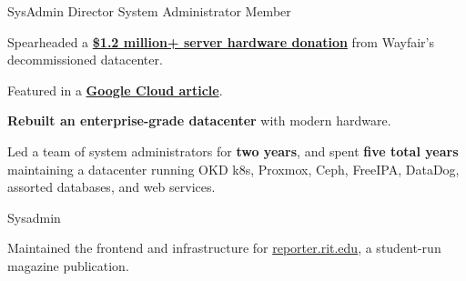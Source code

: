 \vspace{1.5pt} %


\cvtag{\LaTeX}

\smallskip


{
	{SysAdmin Director}    \hfill{}\newline
	{System Administrator} \hfill{}\newline
	{Member}               \hfill{}\newline
}
{
	\item{Spearheaded a \href{https://www.rit.edu/news/wayfair-gifts-850000-servers-rits-computer-science-house}{\textbf{\$1.2 million+ server hardware donation}} from Wayfair's decommissioned datacenter.}
	\item{Featured in a \href{https://cloud.google.com/blog/transform/wayfair-server-donation-mass-open-cloud-rit-student-innovation-johonnot}{\textbf{Google Cloud article}}.}
	\item{\textbf{Rebuilt an enterprise-grade datacenter} with modern hardware.}
	\item{Led a team of system administrators for \textbf{two years}, and spent \textbf{five total years} maintaining a datacenter running OKD k8s, Proxmox, Ceph, FreeIPA, DataDog, assorted databases, and web services.}
}

{
	{Sysadmin} \hfill{}\newline
}
{
	\item{Maintained the frontend and infrastructure for \href{https://reporter.rit.edu}{reporter.rit.edu}, a student-run magazine publication.}
}

